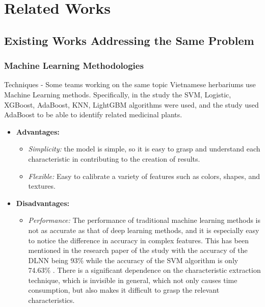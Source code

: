 \documentclass[conference]{IEEEtran}
\begin{document}
\section{Related Works}

\subsection{Existing Works Addressing the Same Problem}

\subsubsection{Machine Learning Methodologies}

Techniques - Some teams working on the same topic Vietnamese herbariums use Machine Learning methods. Specifically, in the study \cite{r1} the SVM, Logistic, XGBoost, AdaBoost, KNN, LightGBM algorithms were used, and the study \cite{r2} used AdaBoost to be able to identify related medicinal plants.

\begin{itemize}
    \item \textbf{Advantages:}
    \begin{itemize}
        \item \textit{Simplicity:} the model is simple, so it is easy to grasp and understand each characteristic in contributing to the creation of results.
        \item \textit{Flexible:} Easy to calibrate a variety of features such as colors, shapes, and textures.
        
    \end{itemize}
    \item \textbf{Disadvantages:}
    \begin{itemize}
        \item \textit{Performance:} The performance of traditional machine learning methods is not as accurate as that of deep learning methods, and it is especially easy to notice the difference in accuracy in complex features. This has been mentioned in the research paper of the study \cite{r3} with the accuracy of the DLNN being 93\% while the accuracy of the SVM algorithm is only 74.63\% . There is a significant dependence on the characteristic extraction technique, which is invisible in general, which not only causes time consumption, but also makes it difficult to grasp the relevant characteristics.
        
    \end{itemize}
\end{itemize}
\end{document}
